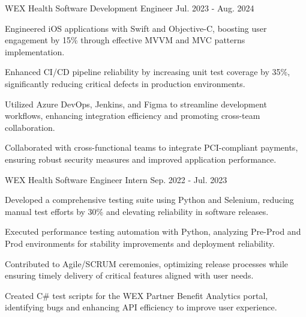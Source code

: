 


\begin{cventries}

  \cventry
    {WEX Health} %
    {Software Development Engineer} %
    {} %
    {Jul. 2023 - Aug. 2024} %
    {
      \begin{cvitems} %
      \item {Engineered iOS applications with Swift and Objective-C, boosting user engagement by 15\% through effective MVVM and MVC patterns implementation.}
    \item {Enhanced CI/CD pipeline reliability by increasing unit test coverage by 35\%, significantly reducing critical defects in production environments.}
    \item {Utilized Azure DevOps, Jenkins, and Figma to streamline development workflows, enhancing integration efficiency and promoting cross-team collaboration.}
    \item {Collaborated with cross-functional teams to integrate PCI-compliant payments, ensuring robust security measures and improved application performance.}
      \end{cvitems}
    }

  \cventry
    {WEX Health} %
    {Software Engineer Intern} %
    {} %
    {Sep. 2022 - Jul. 2023} %
    {
      \begin{cvitems} %
      \item {Developed a comprehensive testing suite using Python and Selenium, reducing manual test efforts by 30\% and elevating reliability in software releases.}
    \item {Executed performance testing automation with Python, analyzing Pre-Prod and Prod environments for stability improvements and deployment reliability.}
    \item {Contributed to Agile/SCRUM ceremonies, optimizing release processes while ensuring timely delivery of critical features aligned with user needs.}
    \item {Created C\# test scripts for the WEX Partner Benefit Analytics portal, identifying bugs and enhancing API efficiency to improve user experience.}
      \end{cvitems}
    }


\end{cventries}
